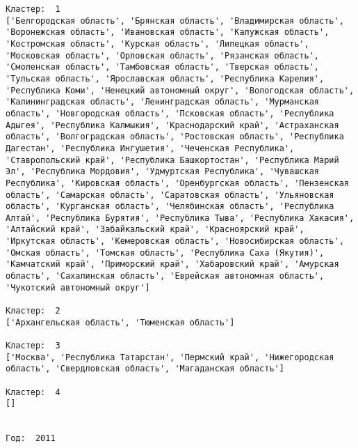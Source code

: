 \documentclass[11pt]{article}
\begin{document}
\begin{Verbatim}[commandchars=\\\{\}]
Кластер:  1
['Белгородская область', 'Брянская область', 'Владимирская область', 'Воронежская область', 'Ивановская область', 'Калужская область', 'Костромская область', 'Курская область', 'Липецкая область', 'Московская область', 'Орловская область', 'Рязанская область', 'Смоленская область', 'Тамбовская область', 'Тверская область', 'Тульская область', 'Ярославская область', 'Республика Карелия', 'Республика Коми', 'Ненецкий автономный округ', 'Вологодская область', 'Калинингpадская область', 'Ленинградская область', 'Мурманская область', 'Новгородская область', 'Псковская область', 'Республика Адыгея', 'Республика Калмыкия', 'Краснодарский край', 'Астраханская область', 'Волгоградская область', 'Ростовская область', 'Республика Дагестан', 'Республика Ингушетия', 'Чеченская Республика', 'Ставропольский край', 'Республика Башкортостан', 'Республика Марий Эл', 'Республика Мордовия', 'Удмуртская Республика', 'Чувашская Республика', 'Кировская область', 'Оренбургская область', 'Пензенская область', 'Самарская область', 'Саратовская область', 'Ульяновская область', 'Курганская область', 'Челябинская область', 'Республика Алтай', 'Республика Бурятия', 'Республика Тыва', 'Республика Хакасия', 'Алтайский край', 'Забайкальский край', 'Красноярский край', 'Иркутская область', 'Кемеровская область', 'Новосибирская область', 'Омская область', 'Томская область', 'Республика Саха (Якутия)', 'Камчатский край', 'Приморский край', 'Хабаровский край', 'Амурская область', 'Сахалинская область', 'Еврейская автономная область', 'Чукотский автономный округ']

Кластер:  2
['Архангельская область', 'Тюменская область']

Кластер:  3
['Москва', 'Республика Татарстан', 'Пермский край', 'Нижегородская область', 'Свердловская область', 'Магаданская область']

Кластер:  4
[]


Год:  2011


\end{Verbatim}
\end{document}
